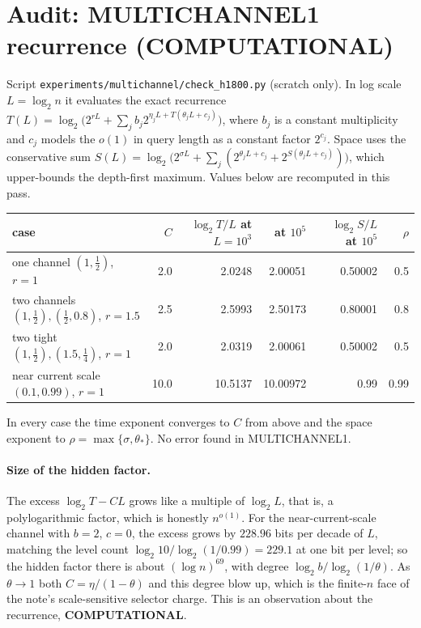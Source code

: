 \documentclass[11pt]{article}
\begin{document}
\section*{Audit: MULTICHANNEL1 recurrence (COMPUTATIONAL)}
Script \texttt{experiments/multichannel/check\_h1800.py} (scratch only). In log scale $L=\log_2 n$ it evaluates the exact recurrence
$T(L)=\log_2\!\big(2^{rL}+\sum_j b_j2^{\eta_jL+T(\theta_jL+c_j)}\big)$, where $b_j$ is a constant multiplicity and $c_j$ models the $o(1)$ in query length as a constant factor $2^{c_j}$. Space uses the conservative sum $S(L)=\log_2\!\big(2^{\sigma L}+\sum_j(2^{\theta_jL+c_j}+2^{S(\theta_jL+c_j)})\big)$, which upper-bounds the depth-first maximum. Values below are recomputed in this pass.
\begin{center}
\begin{tabular}{lrrrrr}
case & $C$ & $\log_2T/L$ at $L=10^3$ & at $10^5$ & $\log_2S/L$ at $10^5$ & $\rho$\\\hline
one channel $(1,\tfrac12)$, $r=1$ & 2.0 & 2.0248 & 2.00051 & 0.50002 & 0.5\\
two channels $(1,\tfrac12),(\tfrac12,0.8)$, $r=1.5$ & 2.5 & 2.5993 & 2.50173 & 0.80001 & 0.8\\
two tight $(1,\tfrac12),(1.5,\tfrac14)$, $r=1$ & 2.0 & 2.0319 & 2.00061 & 0.50002 & 0.5\\
near current scale $(0.1,0.99)$, $r=1$ & 10.0 & 10.5137 & 10.00972 & 0.99 & 0.99\\
\end{tabular}
\end{center}
In every case the time exponent converges to $C$ from above and the space exponent to $\rho=\max\{\sigma,\theta_*\}$. No error found in MULTICHANNEL1.

\paragraph{Size of the hidden factor.} The excess $\log_2T-CL$ grows like a multiple of $\log_2L$, that is, a polylogarithmic factor, which is honestly $n^{o(1)}$. For the near-current-scale channel with $b=2$, $c=0$, the excess grows by $228.96$ bits per decade of $L$, matching the level count $\log_2 10/\log_2(1/0.99)=229.1$ at one bit per level; so the hidden factor there is about $(\log n)^{69}$, with degree $\log_2 b/\log_2(1/\theta)$. As $\theta\to1$ both $C=\eta/(1-\theta)$ and this degree blow up, which is the finite-$n$ face of the note's scale-sensitive selector charge. This is an observation about the recurrence, \textbf{COMPUTATIONAL}.
\end{document}
